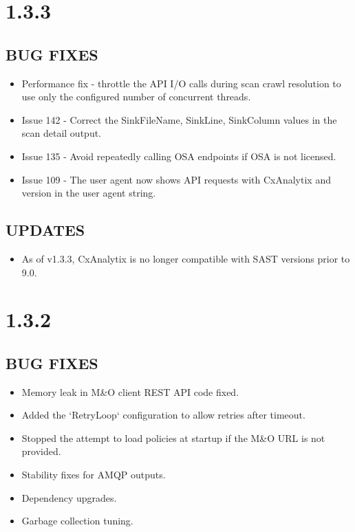 \section{1.3.3}
\subsection*{BUG FIXES}
    \begin{itemize}
        \item Performance fix - throttle the API I/O calls during scan crawl resolution to use only the configured number of concurrent threads.
        \item Issue 142 - Correct the SinkFileName, SinkLine, SinkColumn values in the scan detail output.
        \item Issue 135 - Avoid repeatedly calling OSA endpoints if OSA is not licensed.
        \item Issue 109 - The user agent now shows API requests with CxAnalytix and version in the user agent string.
    \end{itemize}

\subsection*{UPDATES}
    \begin{itemize}
        \item As of v1.3.3, CxAnalytix is no longer compatible with SAST versions prior to 9.0.
    \end{itemize}

\section{1.3.2}
\subsection*{BUG FIXES}
    \begin{itemize}
        \item Memory leak in M\&O client REST API code fixed.
        \item Added the `RetryLoop` configuration to allow retries after timeout.
        \item Stopped the attempt to load policies at startup if the M\&O URL is not provided.
        \item Stability fixes for AMQP outputs.
        \item Dependency upgrades.
        \item Garbage collection tuning.
    \end{itemize}


